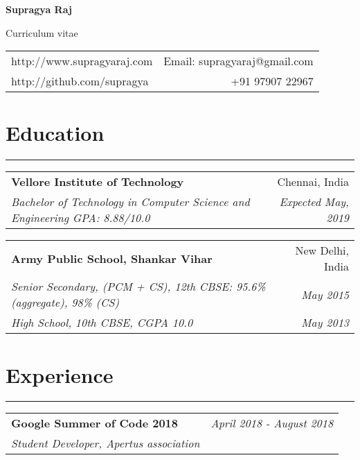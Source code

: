 \documentclass[10pt, a4paper]{article}
\begin{document}
\begin{center}
\Large \textbf{Supragya Raj}


\normalsize Curriculum vitae


\end{center}
\begin{tabularx}{\textwidth}{X r}
	http://www.supragyaraj.com & Email: supragyaraj@gmail.com \\
	http://github.com/supragya & +91 97907 22967 
\end{tabularx}
\newline


\section*{Education}
\vspace{-8px}
\hrule
\vspace{8px}
\hspace{5px}
\begin{tabularx}{\textwidth}{X r}
	\textbf{Vellore Institute of Technology} & Chennai, India \\
	\textit{\small Bachelor of Technology in Computer Science and Engineering GPA: 8.88/10.0} & \textit{Expected May, 2019} 
\end{tabularx}

\vspace{8px}
\hspace{5px}
\begin{tabularx}{\textwidth}{X r}
	\textbf{Army Public School, Shankar Vihar} & New Delhi, India \\
	\textit{\small Senior Secondary, (PCM + CS), 12th CBSE:  95.6\% (aggregate), 98\% (CS)} & \textit{May 2015} \\
	\textit{\small High School, 10th CBSE, CGPA 10.0} & \textit{May 2013}
\end{tabularx}


\section*{Experience}
\vspace{-8px}
\hrule

\vspace{8px}
\hspace{5px}
\begin{tabularx}{\textwidth}{X r}
	\textbf{Google Summer of Code 2018} & \textit{April 2018 - August 2018} \\
	\textit{\small Student Developer, Apertus association} & \\
\end{tabularx}
\end{document}
